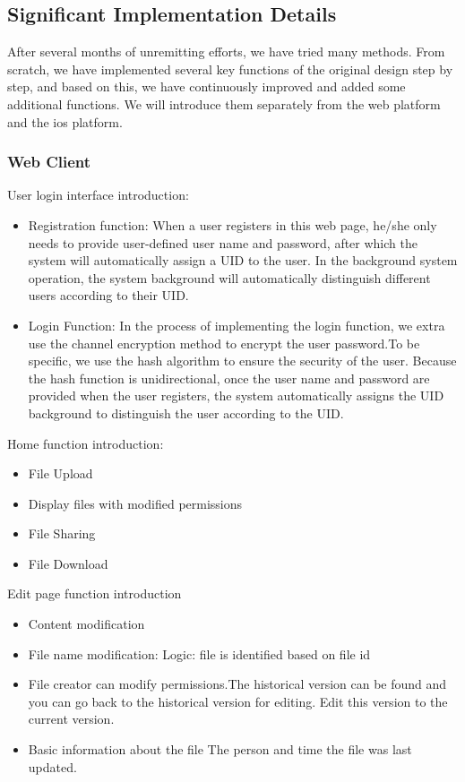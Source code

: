 
\subsection{Significant Implementation Details}
\noindent After several months of unremitting efforts, we have tried many methods. From scratch, we have implemented several key functions of the original design step by step, and based on this, we have continuously improved and added some additional functions. We will introduce them separately from the web platform and the ios platform.

\subsubsection{Web Client}
\noindent User login interface introduction:
\begin{itemize}
    \item Registration function: When a user registers in this web page, he/she only needs to provide user-defined user name and password, after which the system will automatically assign a UID to the user. In the background system operation, the system background will automatically distinguish different users according to their UID.
    \item Login Function: In the process of implementing the login function, we extra use the channel encryption method to encrypt the user password.To be specific, we use the hash algorithm to ensure the security of the user. Because the hash function is unidirectional, once the user name and password are provided when the user registers, the system automatically assigns the UID background to distinguish the user according to the UID.
\end{itemize}

\noindent Home function introduction:
\begin{itemize}
    \item File Upload
    \item Display files with modified permissions
    \item File Sharing
    \item File Download
\end{itemize} 

\noindent Edit page function introduction
\begin{itemize}
    \item Content modification
    \item File name modification: Logic: file is identified based on file id
    \item File creator can modify permissions.The historical version can be found and you can go back to the historical version for editing. Edit this version to the current version.
    \item Basic information about the file The person and time the file was last updated.
\end{itemize}


